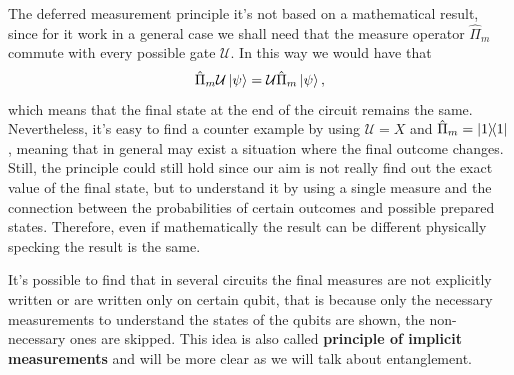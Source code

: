 {
    The deferred measurement principle it's not based on a mathematical result, since for it work in a general case we shall need that the measure operator $\hat{\Pi}_m$ commute with every possible gate $\mathcal{U}$. In this way we would have that
    \begin{equation}
        \hat{\Pi}_m\mathcal{U}\ket{\psi} = \mathcal{U}\hat{\Pi}_m \ket{\psi},
    \end{equation}
    which means that the final state at the end of the circuit remains the same. Nevertheless, it's easy to find a counter example by using $\mathcal{U} = X$ and $\hat{\Pi}_m = \ketbra{1}$, meaning that in general may exist a situation where the final outcome changes. Still, the principle could still hold since our aim is not really find out the exact value of the final state, but to understand it by using a single measure and the connection between the probabilities of certain outcomes and possible prepared states. Therefore, even if mathematically the result can be different physically specking the result is the same.
}

\nt
{
    It's possible to find that in several circuits the final measures are not explicitly written or are written only on certain qubit, that is because only the necessary measurements to understand the states of the qubits are shown, the non-necessary ones are skipped. This idea is also called \textbf{principle of implicit measurements} and will be more clear as we will talk about entanglement.
}